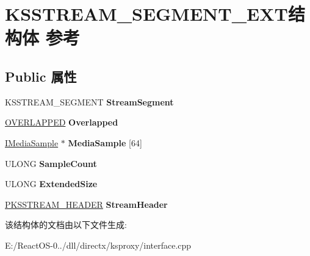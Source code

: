 \hypertarget{struct_k_s_s_t_r_e_a_m___s_e_g_m_e_n_t___e_x_t}{}\section{K\+S\+S\+T\+R\+E\+A\+M\+\_\+\+S\+E\+G\+M\+E\+N\+T\+\_\+\+E\+X\+T结构体 参考}
\label{struct_k_s_s_t_r_e_a_m___s_e_g_m_e_n_t___e_x_t}
\subsection*{Public 属性}
\begin{DoxyCompactItemize}
\item 
\mbox{\label{struct_k_s_s_t_r_e_a_m___s_e_g_m_e_n_t___e_x_t_abeaddf89698454024bba3834f554328d}} 
K\+S\+S\+T\+R\+E\+A\+M\+\_\+\+S\+E\+G\+M\+E\+NT {\bfseries Stream\+Segment}
\item 
\mbox{\label{struct_k_s_s_t_r_e_a_m___s_e_g_m_e_n_t___e_x_t_a5a355c9ed091c8383bee35b0f8656c3b}} 
\hyperlink{struct___o_v_e_r_l_a_p_p_e_d}{O\+V\+E\+R\+L\+A\+P\+P\+ED} {\bfseries Overlapped}
\item 
\mbox{\label{struct_k_s_s_t_r_e_a_m___s_e_g_m_e_n_t___e_x_t_a0f27803ec75d90c05974afb67f058ca0}} 
\hyperlink{interface_i_media_sample}{I\+Media\+Sample} $\ast$ {\bfseries Media\+Sample} \mbox{[}64\mbox{]}
\item 
\mbox{\label{struct_k_s_s_t_r_e_a_m___s_e_g_m_e_n_t___e_x_t_afc8bf0fa12e80f1e0d4f7f223c83c0b2}} 
U\+L\+O\+NG {\bfseries Sample\+Count}
\item 
\mbox{\label{struct_k_s_s_t_r_e_a_m___s_e_g_m_e_n_t___e_x_t_a22de115721760830275ad7ec6705c676}} 
U\+L\+O\+NG {\bfseries Extended\+Size}
\item 
\mbox{\label{struct_k_s_s_t_r_e_a_m___s_e_g_m_e_n_t___e_x_t_a68f16f73e8830f1de213acd9bc231898}} 
\hyperlink{struct_k_s_s_t_r_e_a_m___h_e_a_d_e_r}{P\+K\+S\+S\+T\+R\+E\+A\+M\+\_\+\+H\+E\+A\+D\+ER} {\bfseries Stream\+Header}
\end{DoxyCompactItemize}


该结构体的文档由以下文件生成\+:\begin{DoxyCompactItemize}
\item 
E\+:/\+React\+O\+S-\/0../dll/directx/ksproxy/interface.\+cpp\end{DoxyCompactItemize}
